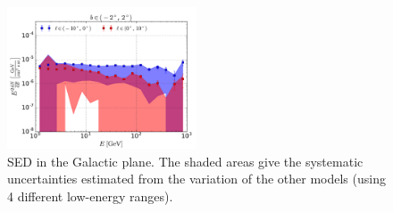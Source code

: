 \begin{figure}[h]
 \includegraphics[width=0.5\textwidth]{plots/Summary_SED_0.pdf}
 \caption{SED in the Galactic plane. The shaded areas give the systematic uncertainties estimated from the variation of the other models (using 4 different low-energy ranges).}
 \label{fig:data_diff}
\end{figure}